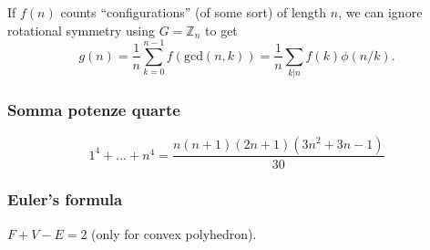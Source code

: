 		 If $f(n)$ counts ``configurations'' (of some sort) of length $n$, we can ignore rotational symmetry using $G = \mathbb Z_n$ to get
		 \[ g(n) = \frac 1 n \sum_{k=0}^{n-1}{f(\text{gcd}(n, k))} = \frac 1 n \sum_{k|n}{f(k)\phi(n/k)}. \]

\subsubsection{Somma potenze quarte}
$$ 1^4+...+n^4=\frac{n(n+1)(2n+1)(3n^2+3n-1)}{30} $$

\subsubsection{Euler's formula} $F+V-E=2$ (only for convex polyhedron).
